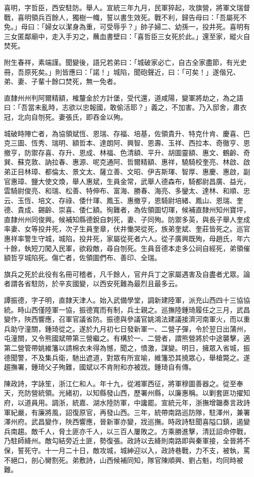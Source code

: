 \begin{pinyinscope}
喜明，字哲臣，西安駐防。舉人。宣統三年九月，民軍猝起，攻旗營，將軍文瑞督戰，喜明領兵百餘人，獨樹一幟，誓以書生效死。戰不利，歸告母曰：「吾屬死不免。」母曰：「婦女以潔身為重，可受辱乎？」帥子婦二、幼孫一，投井死。喜明有三女匿鄰廟中，走入手刃之，蘸血書壁曰：「喜哲臣三女死於此。」還至家，縱火自焚死。

附生春祥，素端謹。聞變後，語兄若弟曰：「城破家必亡，自古全家盡節，有光史冊，吾原死矣。」則皆應曰：「諾！」城陷，聞砲聲近，曰：「可矣！」遂偕兄、弟、妻、子輩十餘口焚死，無一免者。

直隸州州判阿爾精額，榷釐金於方計堡，受代還，道咸陽，變軍將劫之，為之語曰：「吾當未亂時，志欲以忠報國，敢偷活耶？」義之，不加害。乃入邸舍，肅衣冠，北向自刎死。妻張氏，即吞金以殉。

城破時陣亡者，為協領斌恆、恩瑞、存福、培基，佐領貴升、特克什肯、慶喜、巴克三圖、恆秀、瑞明、額哲本、達朗阿、興智、恩壽、玉祥、西拉本、奇徹亨、恩撤亨，防禦存喜、存升、恩成、林福、色清額、平升、胡圖靈額、惠文、鶴齡、奇巽、蘇克敦、訥拉春、惠源、呢克通阿、哲爾精額、惠祥，驍騎校奎亮、林啟、啟弟正目林璋、都倫太、景文太、薩立善、文昭、伊吉斯琿、智厚、惠慶、惠啟，副官惠璋、鹽大使文煥，舉人惠斌，生員金常，武舉人德森布，騎都尉昌廣、益光，雲騎尉俊亮、和瑞、松善、特伸布、富海、勝春、海亮、多鑾太、達林、和順、忠云、玉恆、培文、存祿、倭什琿、鳳玉、惠撤亨，恩騎尉培緒、鳳山、恩瑞、奎德、貴成、錫齡、崇喜、倭仁額。徇難者，為佐領圖切琿，候補直隸州知州寶坪，直隸州州同俊興。候補知縣德銳自刺死，妻、子同殉。防禦多英，與長子舉人奎成率妻、女等投井死，次子生員奎章，伏井慟哭從死，族弟奎斌、奎莊皆死之。巡官惠祥率警生守城，城陷，投井死，家屬從死者六人。從子廣興既殉，母趙氏，年六十餘，執短刀闖入民軍，欲殺敵，尋自刎死。生員音德本走多公祠自經死，弟領催額哲亨城陷死。傷亡者，佐領圖們布、善印、全瑞。

旗兵之死於此役有名冊可稽者，凡千餘人，官弁兵丁之家屬遇害及自盡者尤眾。論者謂各省駐防，於辛亥國變，以西安死難為最烈且最多云。

譚振德，字子明，直隸天津人。始入武備學堂，調新建陸軍，派充山西四十三協協統。時山西僅陸軍一協，振德寬而有制，兵士親之。巡撫陸鍾琦履任之三月，武昌變作，陜西響應，召軍官議省防。振德與參議官姚鴻法建議接濟河南軍火，而以重兵助守潼關，鍾琦從之。遂於九月初七日發新軍一、二營子彈，令於翌日出蒲州，屯潼關，又令熊國斌帶第三營繼之。有構於一、二營者，謂熊營將於中途襲擊，適第二營管帶姚維籓以請棉衣未得為憾，聞之，憤激，謀變。明日，擁眾入省城，振德聞警，不及集兵衛，馳出遮道，對眾有所宣喻，維籓恐其撓眾心，舉槍斃之。遂趨撫署，鍾琦父子殉難，國斌以不肯附和亦被戕。鍾琦自有傳。

陳政詩，字詠笙，浙江仁和人。年十九，從湘軍西征，將軍穆圖善器之。從至奉天，充防營統領。光緒初，以知縣發山西，歷署州縣，以廉惠稱。以剿套匪功擢知府，以道員用。調浙，統嘉、湖水陸防軍，中讒罷。宣統元年，浙撫增韞奏言政詩軍紀嚴，有廉將風，詔復原官，再發山西。三年，統帶南路巡防隊，駐澤州，兼署澤州府。武昌變作，陜西響應，晉新軍亦變，戕巡撫。時政詩駐聞喜隘口鎮，遏變兵南趨。敵千人，脅土匪亦千人，以三百人屢敗之。方乘勝進擊，清廷詔命停戰，乃駐師絳州。敵勾結旁近土匪，勢復張。政詩以去絳則南路即與秦軍接，全晉將不保，誓死守。十一月二十日，敵攻城，城紳迎以入，政詩巷戰，力不支，被執，罵不絕口，剖心臠割死。弟敷詩，山西候補同知，隊官陳順興、劉占魁，均同時被難。


\end{pinyinscope}

